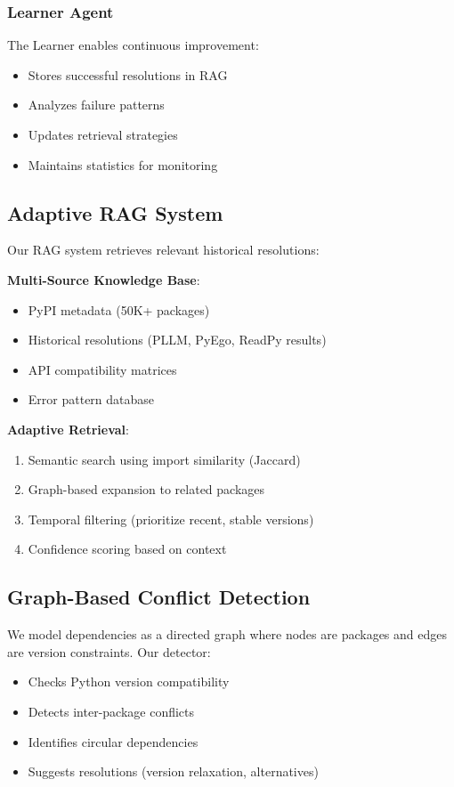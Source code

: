 \documentclass[sigconf]{acmart}
\begin{document}
\subsubsection{Learner Agent}

The Learner enables continuous improvement:
\begin{itemize}
\item Stores successful resolutions in RAG
\item Analyzes failure patterns
\item Updates retrieval strategies
\item Maintains statistics for monitoring
\end{itemize}

\subsection{Adaptive RAG System}

Our RAG system retrieves relevant historical resolutions:

\textbf{Multi-Source Knowledge Base}:
\begin{itemize}
\item PyPI metadata (50K+ packages)
\item Historical resolutions (PLLM, PyEgo, ReadPy results)
\item API compatibility matrices
\item Error pattern database
\end{itemize}

\textbf{Adaptive Retrieval}:
\begin{enumerate}
\item Semantic search using import similarity (Jaccard)
\item Graph-based expansion to related packages
\item Temporal filtering (prioritize recent, stable versions)
\item Confidence scoring based on context
\end{enumerate}

\subsection{Graph-Based Conflict Detection}

We model dependencies as a directed graph where nodes are packages and edges are version constraints. Our detector:
\begin{itemize}
\item Checks Python version compatibility
\item Detects inter-package conflicts
\item Identifies circular dependencies
\item Suggests resolutions (version relaxation, alternatives)
\end{itemize}
\end{document}
